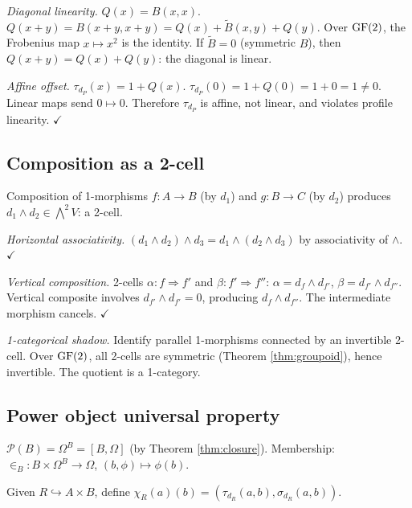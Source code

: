 \emph{Diagonal linearity.}
$Q(x) = B(x, x)$.
$Q(x + y) = B(x+y, x+y) = Q(x) + \widetilde{B}(x,y) +
Q(y)$. Over $\operatorname{GF}(2)$, the Frobenius map $x \mapsto x^2$
is the identity. If $\widetilde{B} = 0$ (symmetric $B$),
then $Q(x+y) = Q(x) + Q(y)$: the diagonal is linear.

\emph{Affine offset.}
$\tau_{d_P}(x) = 1 + Q(x)$.
$\tau_{d_P}(0) = 1 + Q(0) = 1 + 0 = 1 \neq 0$.
Linear maps send $0 \mapsto 0$. Therefore $\tau_{d_P}$
is affine, not linear, and violates profile linearity.
$\checkmark$

\subsection{Composition as a 2-cell}
\label{app:composition-2cell}

Composition of 1-morphisms $f: A \to B$ (by $d_1$) and
$g: B \to C$ (by $d_2$) produces
$d_1 \wedge d_2 \in \bigwedge^2 V$: a 2-cell.

\emph{Horizontal associativity.}
$(d_1 \wedge d_2) \wedge d_3 = d_1 \wedge (d_2 \wedge d_3)$
by associativity of $\wedge$. $\checkmark$

\emph{Vertical composition.}
2-cells $\alpha: f \Rightarrow f'$ and
$\beta: f' \Rightarrow f''$: $\alpha = d_f \wedge d_{f'}$,
$\beta = d_{f'} \wedge d_{f''}$. Vertical composite
involves $d_{f'} \wedge d_{f'} = 0$, producing
$d_f \wedge d_{f''}$. The intermediate morphism cancels.
$\checkmark$

\emph{1-categorical shadow.}
Identify parallel 1-morphisms connected by an invertible
2-cell. Over $\operatorname{GF}(2)$, all 2-cells are symmetric
(Theorem \ref{thm:groupoid}), hence invertible. The
quotient is a 1-category.

\subsection{Power object universal property}
\label{app:power-object}

$\mathcal{P}(B) = \Omega^B = [B, \Omega]$ (by Theorem
\ref{thm:closure}). Membership:
${\in_B}: B \times \Omega^B \to \Omega$,
$(b, \phi) \mapsto \phi(b)$.

Given $R \hookrightarrow A \times B$, define
$\chi_R(a)(b) = (\tau_{d_R}(a,b), \sigma_{d_R}(a,b))$.

